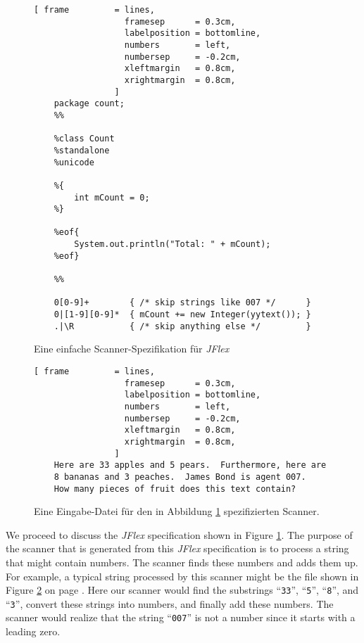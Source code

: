 \begin{figure}[!ht]
\centering
\begin{Verbatim}[ frame         = lines, 
                  framesep      = 0.3cm, 
                  labelposition = bottomline,
                  numbers       = left,
                  numbersep     = -0.2cm,
                  xleftmargin   = 0.8cm,
                  xrightmargin  = 0.8cm,
                ]
    package count;
    %%
    
    %class Count
    %standalone
    %unicode
    
    %{
        int mCount = 0;
    %}
    
    %eof{
        System.out.println("Total: " + mCount); 
    %eof}
    
    %%

    0[0-9]+        { /* skip strings like 007 */      }
    0|[1-9][0-9]*  { mCount += new Integer(yytext()); }
    .|\R           { /* skip anything else */         }
\end{Verbatim}
\vspace*{-0.3cm}
\caption{Eine einfache Scanner-Spezifikation f\"ur \textsl{JFlex}}
\label{fig:count.jflex}
\end{figure}

\begin{figure}[!ht]
\centering
\begin{Verbatim}[ frame         = lines, 
                  framesep      = 0.3cm, 
                  labelposition = bottomline,
                  numbers       = left,
                  numbersep     = -0.2cm,
                  xleftmargin   = 0.8cm,
                  xrightmargin  = 0.8cm,
                ]
    Here are 33 apples and 5 pears.  Furthermore, here are
    8 bananas and 3 peaches.  James Bond is agent 007.  
    How many pieces of fruit does this text contain?
\end{Verbatim}
\vspace*{-0.3cm}
\caption{Eine Eingabe-Datei f\"ur den in Abbildung \ref{fig:count.jflex} spezifizierten Scanner.}
\label{fig:input.txt}
\end{figure}

We proceed to discuss the \textsl{JFlex} specification shown in Figure \ref{fig:count.jflex}.
The purpose of the scanner that is generated from this \textsl{JFlex} specification is to process 
a string that might contain numbers.  The scanner finds these numbers and adds them up.
For example, a typical string processed by this scanner might be the file shown in 
Figure \ref{fig:input.txt} on page \pageref{fig:input.txt}.  Here our scanner would find the
substrings ``\texttt{33}'', ``\texttt{5}'', ``\texttt{8}'', and ``\texttt{3}'', convert these
strings into numbers, and finally add these numbers.  The scanner would
realize that the string ``\texttt{007}'' is not a number since it starts with a leading zero.

